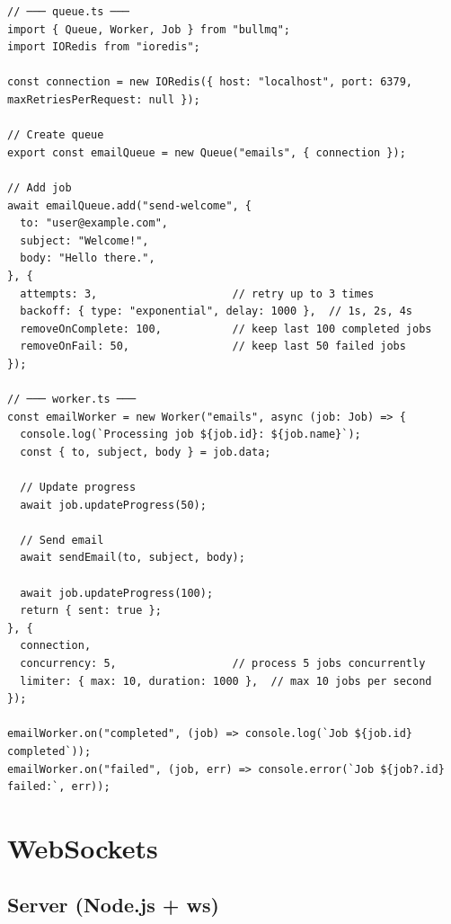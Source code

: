 \documentclass[10pt, a4paper]{article}
\begin{document}
\begin{lstlisting}[language=myjs]
// ─── queue.ts ───
import { Queue, Worker, Job } from "bullmq";
import IORedis from "ioredis";

const connection = new IORedis({ host: "localhost", port: 6379, maxRetriesPerRequest: null });

// Create queue
export const emailQueue = new Queue("emails", { connection });

// Add job
await emailQueue.add("send-welcome", {
  to: "user@example.com",
  subject: "Welcome!",
  body: "Hello there.",
}, {
  attempts: 3,                     // retry up to 3 times
  backoff: { type: "exponential", delay: 1000 },  // 1s, 2s, 4s
  removeOnComplete: 100,           // keep last 100 completed jobs
  removeOnFail: 50,                // keep last 50 failed jobs
});

// ─── worker.ts ───
const emailWorker = new Worker("emails", async (job: Job) => {
  console.log(`Processing job ${job.id}: ${job.name}`);
  const { to, subject, body } = job.data;
  
  // Update progress
  await job.updateProgress(50);
  
  // Send email
  await sendEmail(to, subject, body);
  
  await job.updateProgress(100);
  return { sent: true };
}, {
  connection,
  concurrency: 5,                  // process 5 jobs concurrently
  limiter: { max: 10, duration: 1000 },  // max 10 jobs per second
});

emailWorker.on("completed", (job) => console.log(`Job ${job.id} completed`));
emailWorker.on("failed", (job, err) => console.error(`Job ${job?.id} failed:`, err));
\end{lstlisting}


\bigskip


\section{WebSockets}


\subsection{Server (Node.js + ws)}
\end{document}
